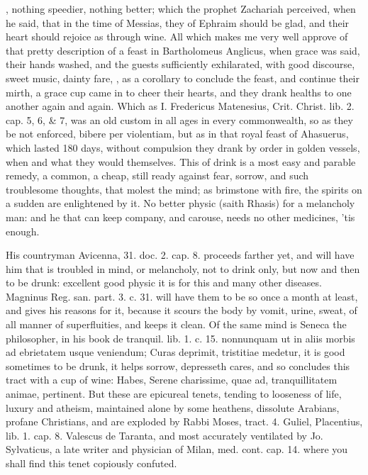 , nothing
speedier, nothing better; which the prophet Zachariah perceived, when
he said, that in the time of Messias, they of Ephraim should be glad,
and their heart should rejoice as through wine. All which makes me very
well approve of that pretty description of a feast in 
Bartholomeus Anglicus, when grace was said, their hands washed, and the
guests sufficiently exhilarated, with good discourse, sweet music,
dainty fare, , as a corollary to conclude the feast, and continue their
mirth, a grace cup came in to cheer their hearts, and they drank
healths to one another again and again. Which as I. Fredericus
Matenesius, Crit. Christ. lib. 2. cap. 5, 6, \& 7, was an old custom in
all ages in every commonwealth, so as they be not enforced, bibere per
violentiam, but as in that royal feast of  Ahasuerus, which
lasted 180 days, without compulsion they drank by order in golden
vessels, when and what they would themselves. This of drink is a most
easy and parable remedy, a common, a cheap, still ready against fear,
sorrow, and such troublesome thoughts, that molest the mind; as
brimstone with fire, the spirits on a sudden are enlightened by it. No
better physic (saith Rhasis) for a melancholy man: and he that
can keep company, and carouse, needs no other medicines, 'tis enough.

His countryman Avicenna, 31. doc. 2. cap. 8. proceeds farther yet, and
will have him that is troubled in mind, or melancholy, not to drink
only, but now and then to be drunk: excellent good physic it is for
this and many other diseases. Magninus Reg. san. part. 3. c. 31. will
have them to be so once a month at least, and gives his reasons for it,
because it scours the body by vomit, urine, sweat, of all manner
of superfluities, and keeps it clean. Of the same mind is Seneca the
philosopher, in his book de tranquil. lib. 1. c. 15. nonnunquam ut in
aliis morbis ad ebrietatem usque veniendum; Curas deprimit, tristitiae
medetur, it is good sometimes to be drunk, it helps sorrow, depresseth
cares, and so concludes this tract with a cup of wine: Habes, Serene
charissime, quae ad, tranquillitatem animae, pertinent. But these are
epicureal tenets, tending to looseness of life, luxury and atheism,
maintained alone by some heathens, dissolute Arabians, profane
Christians, and are exploded by Rabbi Moses, tract. 4. Guliel,
Placentius, lib. 1. cap. 8. Valescus de Taranta, and most accurately
ventilated by Jo. Sylvaticus, a late writer and physician of Milan,
med. cont. cap. 14. where you shall find this tenet copiously confuted.

